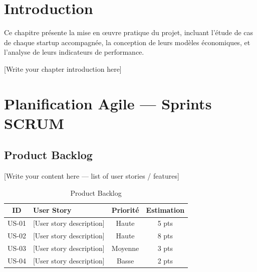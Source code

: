 

\section*{Introduction}

Ce chapitre présente la mise en œuvre pratique du projet, incluant l'étude de cas de chaque startup accompagnée, la conception de leurs modèles économiques, et l'analyse de leurs indicateurs de performance.

[Write your chapter introduction here]


\section{Planification Agile — Sprints SCRUM}
\label{sec:sprint-planning}

\subsection{Product Backlog}
\label{sec:product-backlog}

[Write your content here — list of user stories / features]

\begin{table}[H]
  \centering
  \caption{Product Backlog}
  \label{tab:product-backlog}
  \begin{tabularx}{\textwidth}{c X c c}
    \toprule
    \textbf{ID} & \textbf{User Story} & \textbf{Priorité} & \textbf{Estimation} \\
    \midrule
    US-01 & [User story description] & Haute  & 5 pts \\
    US-02 & [User story description] & Haute  & 8 pts \\
    US-03 & [User story description] & Moyenne & 3 pts \\
    US-04 & [User story description] & Basse  & 2 pts \\
    \bottomrule
  \end{tabularx}
\end{table}

